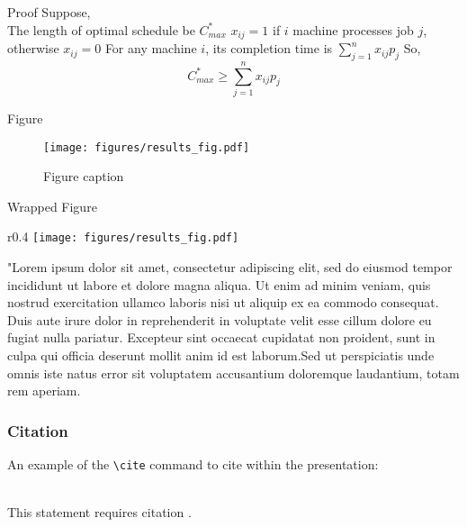 \documentclass[aspectratio=169,xcolor=dvipsnames, t]{beamer}
\begin{document}
\begin{frame}{Proof}
    Suppose, \\
    The length of optimal schedule be $C_{max}^*$ \newline \newline \pause
    $x_{ij}=1$ if $i$ machine processes job $j$, otherwise $x_{ij}=0$ \newline \newline \pause
    For any machine $i$, its completion time is $\sum_{j=1}^{n} x_{ij}p_j$ \newline \newline \pause
    So,
    \begin{equation}
        C_{max}^* \ge \sum_{j=1}^{n} x_{ij}p_j
    \end{equation}
\end{frame}

\begin{frame}{Figure}
    \begin{figure}
    \texttt{[image: figures/results\_fig.pdf]}
    \caption{Figure caption}
    \end{figure}
\end{frame}

\begin{frame}{Wrapped Figure}
    \begin{wrapfigure}{r}{0.4\textwidth}
    \centering
    \texttt{[image: figures/results\_fig.pdf]}
    \caption{Figure caption}
\end{wrapfigure}
"Lorem ipsum dolor sit amet, consectetur adipiscing elit, sed do eiusmod tempor incididunt ut labore et dolore magna aliqua. Ut enim ad minim veniam, quis nostrud exercitation ullamco laboris nisi ut aliquip ex ea commodo consequat. Duis aute irure dolor in reprehenderit in voluptate velit esse cillum dolore eu fugiat nulla pariatur. Excepteur sint occaecat cupidatat non proident, sunt in culpa qui officia deserunt mollit anim id est laborum.Sed ut perspiciatis unde omnis iste natus error sit voluptatem accusantium doloremque laudantium, totam rem aperiam.
\end{frame}

\begin{frame}[fragile] %
    \frametitle{Citation}
    An example of the \verb|\cite| command to cite within the presentation:\\~

    This statement requires citation \cite{p1}.
\end{frame}
\end{document}
